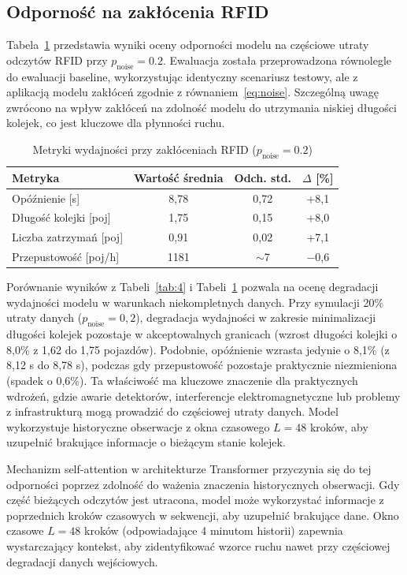 \documentclass[10pt,a4paper]{article}
\begin{document}
\subsection{Odporność na zakłócenia RFID}

Tabela~\ref{tab:5} przedstawia wyniki oceny odporności modelu na częściowe utraty odczytów RFID przy $p_{\text{noise}} = 0.2$. Ewaluacja została przeprowadzona równolegle do ewaluacji baseline, wykorzystując identyczny scenariusz testowy, ale z aplikacją modelu zakłóceń zgodnie z równaniem~\eqref{eq:noise}. Szczególną uwagę zwrócono na wpływ zakłóceń na zdolność modelu do utrzymania niskiej długości kolejek, co jest kluczowe dla płynności ruchu.

\begin{table}[H]
\centering
\footnotesize
\caption{Metryki wydajności przy zakłóceniach RFID ($p_{\text{noise}} = 0.2$)}
\label{tab:5}
\begin{tabular}{lccc}
\toprule
Metryka & Wartość średnia & Odch. std. & $\Delta$ [\%] \\
\midrule
Opóźnienie [s] & 8,78 & 0,72 & +8,1 \\
Długość kolejki [poj] & 1,75 & 0,15 & +8,0 \\
Liczba zatrzymań [poj] & 0,91 & 0,02 & +7,1 \\
Przepustowość [poj/h] & 1181 & $\sim$7 & $-$0,6 \\
\bottomrule
\end{tabular}
\end{table}

Porównanie wyników z Tabeli~\ref{tab:4} i Tabeli~\ref{tab:5} pozwala na ocenę degradacji wydajności modelu w warunkach niekompletnych danych. Przy symulacji 20\% utraty danych ($p_{\text{noise}} = 0{,}2$), degradacja wydajności w zakresie minimalizacji długości kolejek pozostaje w akceptowalnych granicach (wzrost długości kolejki o 8,0\% z 1,62 do 1,75 pojazdów). Podobnie, opóźnienie wzrasta jedynie o 8,1\% (z 8,12 s do 8,78 s), podczas gdy przepustowość pozostaje praktycznie niezmieniona (spadek o 0,6\%). Ta właściwość ma kluczowe znaczenie dla praktycznych wdrożeń, gdzie awarie detektorów, interferencje elektromagnetyczne lub problemy z infrastrukturą mogą prowadzić do częściowej utraty danych. Model wykorzystuje historyczne obserwacje z okna czasowego $L = 48$ kroków, aby uzupełnić brakujące informacje o bieżącym stanie kolejek.

Mechanizm self-attention w architekturze Transformer przyczynia się do tej odporności poprzez zdolność do ważenia znaczenia historycznych obserwacji. Gdy część bieżących odczytów jest utracona, model może wykorzystać informacje z poprzednich kroków czasowych w sekwencji, aby uzupełnić brakujące dane. Okno czasowe $L = 48$ kroków (odpowiadające 4 minutom historii) zapewnia wystarczający kontekst, aby zidentyfikować wzorce ruchu nawet przy częściowej degradacji danych wejściowych.
\end{document}
